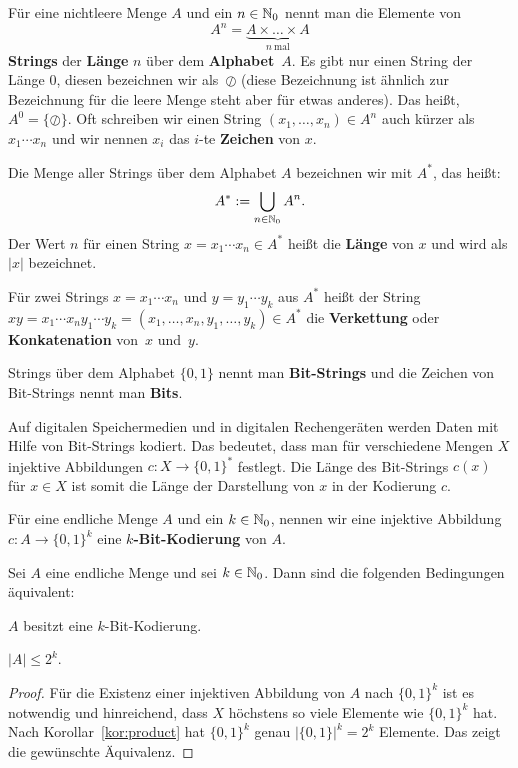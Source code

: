 \begin{defn} 
	Für eine nichtleere Menge $A$ und ein $n \in \mathbb{N}_0$ nennt man die Elemente von 
	\[
		A^n = \underbrace{A\times\ldots\times A}_{n \ \text{mal}}
	\]
	\textbf{Strings} der \textbf{Länge} $n$ über dem \textbf{Alphabet}~$A$.
	Es gibt nur einen String der Länge $0$, diesen bezeichnen wir als~$\oslash$ (diese Bezeichnung ist ähnlich zur Bezeichnung für die leere Menge steht aber für etwas anderes). 
	Das heißt, $A^0 = \{\oslash\}$. 
	Oft schreiben wir einen String $(x_1,\ldots,x_n) \in A^n$ auch kürzer als $x_1 \cdots x_n$ und wir nennen $x_i$ das $i$-te \textbf{Zeichen} von $x$. 
	
	Die Menge aller Strings über dem Alphabet $A$ bezeichnen wir mit $A^\ast$, das heißt: 
	\[
		A^\ast := \bigcup_{n \in \mathbb{N}_0} A^n.
	\]
	Der Wert $n$ für einen String $x = x_1 \cdots x_n \in A^\ast$ heißt die \textbf{Länge} von $x$ und wird als $|x|$ bezeichnet. 
\end{defn}

\begin{defn} 
		Für zwei Strings $x=x_1 \cdots x_n$ und $y=y_1 \cdots y_k$ aus $A^\ast$ heißt der String $xy = x_1 \cdots x_n y_1 \cdots y_k = (x_1,\ldots,x_n,y_1,\ldots,y_k) \in A^\ast$ die \textbf{Verkettung} oder \textbf{Konkatenation} von~$x$ und~$y$. 
\end{defn} 

\begin{defn} 
		Strings über dem Alphabet $\{0,1\}$ nennt man \textbf{Bit-Strings} und die Zeichen von Bit-Strings nennt man \textbf{Bits}.
\end{defn} 

\begin{bem}
	Auf digitalen Speichermedien und in digitalen Rechengeräten werden Daten mit Hilfe von Bit-Strings kodiert. Das bedeutet, dass man für verschiedene Mengen $X$ injektive Abbildungen $c : X \to \{0,1\}^\ast$ festlegt. Die Länge des Bit-Strings $c(x)$ für $x \in X$ ist somit die Länge der Darstellung von $x$ in der Kodierung $c$. 
\end{bem} 

\begin{defn}
	Für eine endliche Menge $A$ und ein $k \in \mathbb{N}_0$, nennen wir eine injektive Abbildung $c: A \to \{0,1\}^k$ eine \textbf{$k$-Bit-Kodierung} von $A$. 
\end{defn} 

\begin{prop}
Sei $A$ eine endliche Menge und sei $k \in \mathbb{N}_0$. Dann sind die folgenden Bedingungen äquivalent: 
\begin{enumi} 
	\item $A$ besitzt eine $k$-Bit-Kodierung.
	\item $ |A| \le 2^k$. 
\end{enumi} 
\end{prop} 
\begin{proof} 
	Für die Existenz einer injektiven Abbildung von $A$ nach $\{0,1\}^k$ ist es notwendig und hinreichend, dass $X$ höchstens so viele Elemente wie $\{0,1\}^k$ hat. Nach Korollar~\ref{kor:product} hat $\{0,1\}^k$ genau $|\{0,1\}|^k = 2^k$ Elemente. Das zeigt die gewünschte Äquivalenz. 
\end{proof} 

